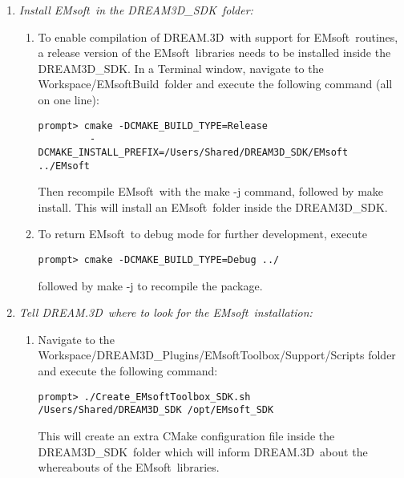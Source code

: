 \documentclass[11pt]{amsart}
\newcommand{\ems}{\textsf{EMsoft}}
\newcommand{\emsb}{\textsf{Workspace/EMsoftBuild}}
\newcommand{\dtd}{\textsf{DREAM.3D}}
\newcommand{\dtdsdk}{\textsf{DREAM3D\_SDK}}
\begin{document}
\begin{enumerate}
\item \textit{Install \ems\ in the \dtdsdk\ folder:}
\begin{enumerate}
\item To enable compilation of \dtd\ with support for \ems\ routines, a release version of the \ems\ libraries needs to be installed inside the \dtdsdk.  
In a Terminal window, navigate to the \emsb\ folder and execute the following command (all on one line):
{\small\begin{verbatim}
prompt> cmake -DCMAKE_BUILD_TYPE=Release 
         -DCMAKE_INSTALL_PREFIX=/Users/Shared/DREAM3D_SDK/EMsoft ../EMsoft
\end{verbatim}}
Then recompile \ems\ with the \textsf{make -j} command, followed by \textsf{make install}.  This will install an \ems\ folder inside the \dtdsdk.
\item To return \ems\ to debug mode for further development, execute
{\small\begin{verbatim}
prompt> cmake -DCMAKE_BUILD_TYPE=Debug ../
\end{verbatim}}
followed by \textsf{make -j} to recompile the package.
\end{enumerate}

\item \textit{Tell \dtd\ where to look for the \ems\ installation:}  
\begin{enumerate}
\item Navigate to the \textsf{Workspace/DREAM3D\_Plugins/EMsoftToolbox/Support/Scripts} folder and execute the following command:
{\small\begin{verbatim}
prompt> ./Create_EMsoftToolbox_SDK.sh  /Users/Shared/DREAM3D_SDK /opt/EMsoft_SDK
\end{verbatim}}
This will create an extra CMake configuration file inside the \dtdsdk\ folder which will inform \dtd\ about the whereabouts of the \ems\ libraries.
\end{enumerate}


\end{enumerate}
\end{document}
